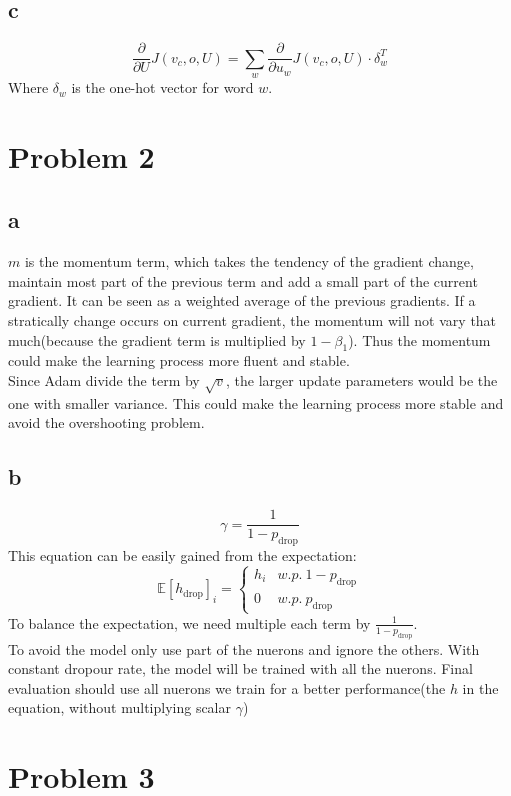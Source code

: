 \documentclass{article}
\begin{document}
\subsection*{c}
\[
    \frac{\partial}{\partial U}J(v_c,o,U)=\sum_w\frac{\partial}{\partial u_w}J(v_c,o,U)\cdot\delta_w^T
\]
Where $\delta_w$ is the one-hot vector for word $w$.
\section{Problem 2}
\subsection*{a}
$m$ is the momentum term, which takes the tendency of the gradient change, maintain most part of the previous term and add a small part of the current gradient. It can be seen as a weighted average of the previous gradients. If a stratically change occurs on current gradient, the momentum will not vary that much(because the gradient term is multiplied by $1-\beta_1$). Thus the momentum could make the learning process more fluent and stable.\\
Since Adam divide the term by $\sqrt{v}$, the larger update parameters would be the one with smaller variance. This could make the learning process more stable and avoid the overshooting problem.\\
\subsection*{b}
\[
    \gamma=\frac{1}{1-p_{\text{drop}}}
\]
This equation can be easily gained from the expectation:
\[
    \mathbb{E}[h_\text{drop}]_i=\begin{cases}
        h_i & w.p.~1-p_{\text{drop}} \\
        0 & w.p.~p_{\text{drop}}
    \end{cases}
\]
To balance the expectation, we need multiple each term by $\frac{1}{1-p_{\text{drop}}}$.\\
To avoid the model only use part of the nuerons and ignore the others. With constant dropour rate, the model will be trained with all the nuerons. Final evaluation should use all nuerons we train for a better performance(the $h$ in the equation, without multiplying scalar $\gamma$)
\section{Problem 3}
\end{document}

